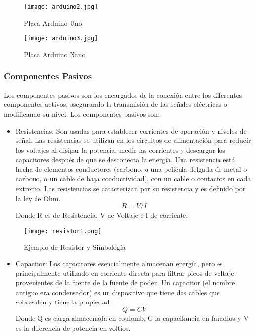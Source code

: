 \begin{figure}[H]
	\centering
	\texttt{[image: arduino2.jpg]}
	\caption{Placa Arduino Uno}
\end{figure}

\begin{figure}[H]
	\centering
	\texttt{[image: arduino3.jpg]}
	\caption{Placa Arduino Nano}
\end{figure}

\subsubsection{Componentes Pasivos }

\par \noindent
Los componentes pasivos son los encargados de la conexión entre los diferentes componentes activos, asegurando la transmisión de las señales eléctricas o modificando su nivel.\cite{artofelectronics} Los componentes pasivos son:

\begin{itemize}
	\item Resistencias: Son usadas para establecer corrientes de operación y niveles de señal. Las resistencias se utilizan en los circuitos de alimentación para reducir los voltajes al disipar la potencia, medir las corrientes y descargar los capacitores después de que se desconecta la energía. Una resistencia está hecha de elementos conductores (carbono, o una película delgada de metal o carbono, o un cable de baja conductividad), con un cable o contactos en cada extremo. Las resistencias se caracterizan por su resistencia y es definido por la ley de Ohm.\cite{artofelectronics} 
	$$R = V/I$$
	Donde R es de Resistencia, V de Voltaje e I de corriente.
\end{itemize}

\begin{figure}[H]
	\centering
	\texttt{[image: resistor1.png]}
	\caption{Ejemplo de Resistor y Simbología}
\end{figure}

\begin{itemize}
	\item Capacitor: Los capacitores esencialmente almacenan energía, pero es principalmente utilizado en corriente directa para filtrar picos de voltaje provenientes de la fuente de la fuente de poder.\cite{artofelectronics} Un capacitor (el nombre antiguo era condensador) es un dispositivo que tiene dos cables que sobresalen y tiene la propiedad: 
	$$Q = CV$$
	Donde Q es carga almacenada en coulomb, C la capacitancia en faradios y V es la diferencia de potencia en voltios.
\end{itemize}

